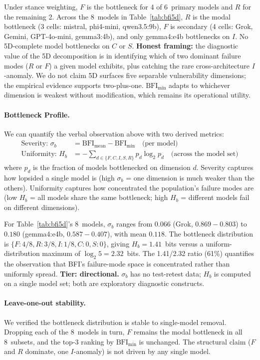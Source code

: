 \documentclass[11pt,a4paper]{article}
\begin{document}
Under stance weighting, $F$ is the bottleneck for 4 of 6~primary models and $R$ for the remaining 2. Across the 8~models in Table~\ref{tab:bfi5d}, $R$ is the modal bottleneck (3 cells: mistral, phi4-mini, qwen3.5:9b), $F$ is secondary (4 cells: Grok, Gemini, GPT-4o-mini, gemma3:4b), and only gemma4:e4b bottlenecks on $I$. No 5D-complete model bottlenecks on $C$ or $S$. \textbf{Honest framing:} the diagnostic value of the 5D decomposition is in identifying which of two dominant failure modes ($R$ or $F$) a given model exhibits, plus catching the rare cross-architecture $I$-anomaly. We do not claim 5D surfaces five separable vulnerability dimensions; the empirical evidence supports two-plus-one. $\text{BFI}_{\min}$ adapts to whichever dimension is weakest without modification, which remains its operational utility.

\paragraph{Bottleneck Profile.}
We can quantify the verbal observation above with two derived metrics:
\begin{align}
    \text{Severity: } \sigma_b &= \text{BFI}_{\text{mean}} - \text{BFI}_{\min}  \quad \text{(per model)} \\
    \text{Uniformity: } H_b &= -\!\!\sum_{d \in \{F,C,I,S,R\}} \!\!p_d \log_2 p_d  \quad \text{(across the model set)}
\end{align}
where $p_d$ is the fraction of models bottlenecked on dimension $d$. Severity captures how lopsided a single model is (high $\sigma_b$ = one dimension is much weaker than the others). Uniformity captures how concentrated the population's failure modes are (low $H_b$ = all models share the same bottleneck; high $H_b$ = different models fail on different dimensions).

For Table~\ref{tab:bfi5d}'s 8~models, $\sigma_b$ ranges from $0.066$ (Grok, $0.869 - 0.803$) to $0.180$ (gemma4:e4b, $0.587 - 0.407$), with mean $0.118$. The bottleneck distribution is $\{F: 4/8, R: 3/8, I: 1/8, C: 0, S: 0\}$, giving $H_b = 1.41$~bits versus a uniform-distribution maximum of $\log_2 5 = 2.32$~bits. The 1.41/2.32 ratio (61\%) quantifies the observation that BFI's failure-mode space is concentrated rather than uniformly spread. \textbf{Tier: directional.} $\sigma_b$ has no test-retest data; $H_b$ is computed on a single model set; both are exploratory diagnostic constructs.

\paragraph{Leave-one-out stability.}
We verified the bottleneck distribution is stable to single-model removal. Dropping each of the 8~models in turn, $F$ remains the modal bottleneck in all 8~subsets, and the top-3 ranking by $\text{BFI}_{\min}$ is unchanged. The structural claim ($F$ and $R$ dominate, one $I$-anomaly) is not driven by any single model.
\end{document}
